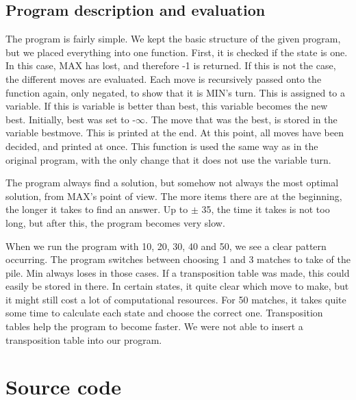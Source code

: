\documentclass{article}
\begin{document}
	\subsection{Program description and evaluation}
	
	The program is fairly simple. We kept the basic structure of the given program, but we placed everything into one function. First, it is checked if the state is one. In this case, MAX has lost, and therefore -1 is returned. If this is not the case, the different moves are evaluated. Each move is recursively passed onto the function again, only negated, to show that it is MIN's turn. This is assigned to a variable. If this is variable is better than best, this variable becomes the new best. Initially, best was set to -$\infty$. The move that was the best, is stored in the variable bestmove. This is printed at the end. At this point, all moves have been decided, and printed at once. This function is used the same way as in the original program, with the only change that it does not use the variable turn.
	
	The program always find a solution, but somehow not always the most optimal solution, from MAX's point of view. The more items there are at the beginning, the longer it takes to find an answer. Up to $\pm$ 35, the time it takes is not too long, but after this, the program becomes very slow. 
	
	When we run the program with 10, 20, 30, 40 and 50, we see a clear pattern occurring. The program switches between choosing 1 and 3 matches to take of the pile. Min always loses in those cases. If a transposition table was made, this could easily be stored in there. In certain states, it quite clear which move to make, but it might still cost a lot of computational resources. For 50 matches, it takes quite some time to calculate each state and choose the correct one. Transposition tables help the program to become faster. We were not able to insert a transposition table into our program.
	
	
	\section{Source code}
	
	
	
	
\end{document}
